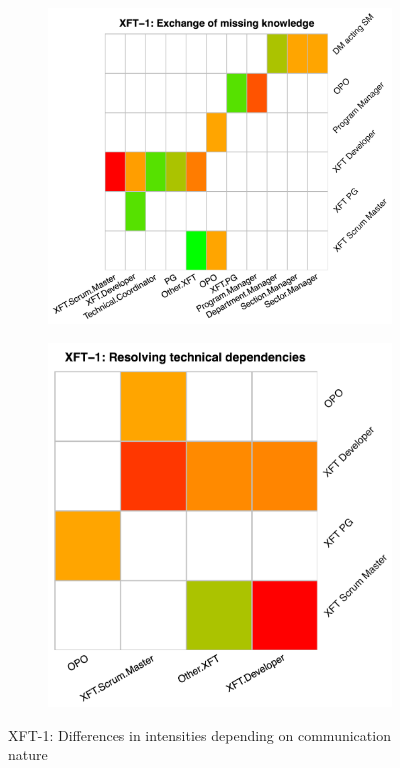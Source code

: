\begin{figure}
\begin{subfigure}{.5\textwidth}
    \label{fig:hm-d-ms2}
  \end{subfigure}
  \begin{subfigure}{.5\textwidth}
    \centering
    \includegraphics[width=.91\linewidth]{figures/heatmaps/ms2-_e_.pdf}
    \label{fig:hm-e-ms2}
  \end{subfigure}%
  \begin{subfigure}{.5\textwidth}
    \centering
    \includegraphics[width=.81\linewidth]{figures/heatmaps/ms2-_r_.pdf}
    \label{fig:hm-r-ms2}
  \end{subfigure}
  \caption{XFT-1: Differences in intensities depending on communication nature}
  \label{fig:hm-overall-ms2}
\end{figure}


